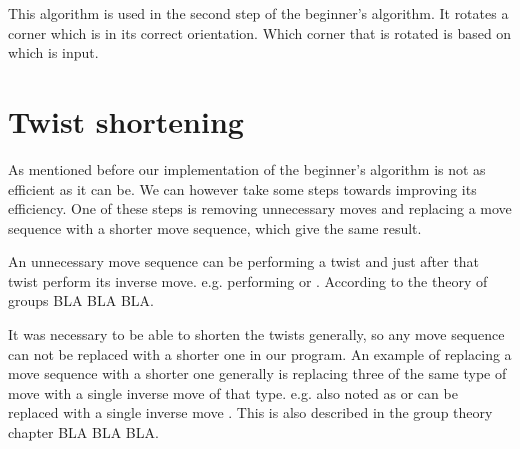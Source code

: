 This algorithm is used in the second step of the beginner's algorithm. It rotates a corner \cpiece{} which is in its correct orientation. Which corner that is rotated is based on which is input. 









\section{Twist shortening}
As mentioned before our implementation of the beginner's algorithm is not as efficient as it can be. We can however take some steps towards improving its efficiency. One of these steps is removing unnecessary moves and replacing a move sequence with a shorter move sequence, which give the same result.

An unnecessary move sequence can be performing a twist and just after that twist perform its inverse move. e.g. performing  or .
According to the theory of groups BLA BLA BLA.

It was necessary to be able to shorten the twists generally, so any move sequence can not be replaced with a shorter one in our program.
An example of replacing a move sequence with a shorter one generally is replacing three of the same type of move with a single inverse move of that type. e.g.  also noted as  or  can be replaced with a single inverse move . This is also described in the group theory chapter BLA BLA BLA.

